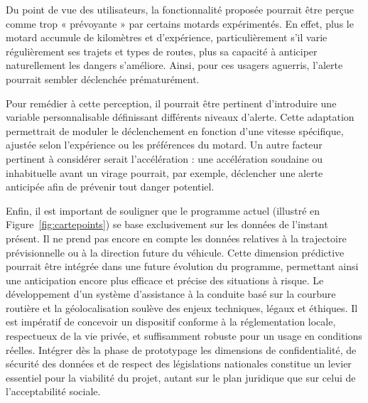 Du point de vue des utilisateurs, la fonctionnalité proposée pourrait être perçue comme trop « prévoyante » par certains motards expérimentés. En effet, plus le motard accumule de kilomètres et d'expérience, particulièrement s'il varie régulièrement ses trajets et types de routes, plus sa capacité à anticiper naturellement les dangers s'améliore. Ainsi, pour ces usagers aguerris, l'alerte pourrait sembler déclenchée prématurément.

Pour remédier à cette perception, il pourrait être pertinent d’introduire une variable personnalisable définissant différents niveaux d’alerte. Cette adaptation permettrait de moduler le déclenchement en fonction d’une vitesse spécifique, ajustée selon l’expérience ou les préférences du motard. Un autre facteur pertinent à considérer serait l'accélération : une accélération soudaine ou inhabituelle avant un virage pourrait, par exemple, déclencher une alerte anticipée afin de prévenir tout danger potentiel.

Enfin, il est important de souligner que le programme actuel (illustré en Figure~\ref{fig:cartepoints}) se base exclusivement sur les données de l’instant présent. Il ne prend pas encore en compte les données relatives à la trajectoire prévisionnelle ou à la direction future du véhicule. Cette dimension prédictive pourrait être intégrée dans une future évolution du programme, permettant ainsi une anticipation encore plus efficace et précise des situations à risque.
\vspace{0.5cm}
\vspace{0.5cm}
Le développement d’un système d’assistance à la conduite basé sur la courbure routière et la géolocalisation soulève des enjeux techniques, légaux et éthiques. Il est impératif de concevoir un dispositif conforme à la réglementation locale, respectueux de la vie privée, et suffisamment robuste pour un usage en conditions réelles. Intégrer dès la phase de prototypage les dimensions de confidentialité, de sécurité des données et de respect des législations nationales constitue un levier essentiel pour la viabilité du projet, autant sur le plan juridique que sur celui de l’acceptabilité sociale.







